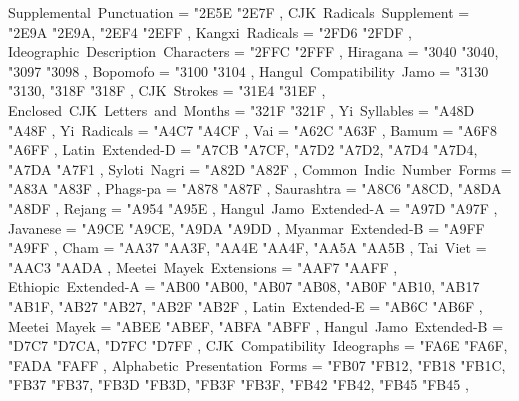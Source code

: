 {    Supplemental~Punctuation                       = { {"2E5E} {"2E7F} },
    CJK~Radicals~Supplement                        = { {"2E9A} {"2E9A}, {"2EF4} {"2EFF} },
    Kangxi~Radicals                                = { {"2FD6} {"2FDF} },
    Ideographic~Description~Characters             = { {"2FFC} {"2FFF} },
    Hiragana                                       = { {"3040} {"3040}, {"3097} {"3098} },
    Bopomofo                                       = { {"3100} {"3104} },
    Hangul~Compatibility~Jamo                      = { {"3130} {"3130}, {"318F} {"318F} },
    CJK~Strokes                                    = { {"31E4} {"31EF} },
    Enclosed~CJK~Letters~and~Months                = { {"321F} {"321F} },
    Yi~Syllables                                   = { {"A48D} {"A48F} },
    Yi~Radicals                                    = { {"A4C7} {"A4CF} },
    Vai                                            = { {"A62C} {"A63F} },
    Bamum                                          = { {"A6F8} {"A6FF} },
    Latin~Extended-D                               = { {"A7CB} {"A7CF}, {"A7D2} {"A7D2}, {"A7D4} {"A7D4}, {"A7DA} {"A7F1} },
    Syloti~Nagri                                   = { {"A82D} {"A82F} },
    Common~Indic~Number~Forms                      = { {"A83A} {"A83F} },
    Phags-pa                                       = { {"A878} {"A87F} },
    Saurashtra                                     = { {"A8C6} {"A8CD}, {"A8DA} {"A8DF} },
    Rejang                                         = { {"A954} {"A95E} },
    Hangul~Jamo~Extended-A                         = { {"A97D} {"A97F} },
    Javanese                                       = { {"A9CE} {"A9CE}, {"A9DA} {"A9DD} },
    Myanmar~Extended-B                             = { {"A9FF} {"A9FF} },
    Cham                                           = { {"AA37} {"AA3F}, {"AA4E} {"AA4F}, {"AA5A} {"AA5B} },
    Tai~Viet                                       = { {"AAC3} {"AADA} },
    Meetei~Mayek~Extensions                        = { {"AAF7} {"AAFF} },
    Ethiopic~Extended-A                            = { {"AB00} {"AB00}, {"AB07} {"AB08}, {"AB0F} {"AB10}, {"AB17} {"AB1F}, {"AB27} {"AB27}, {"AB2F} {"AB2F} },
    Latin~Extended-E                               = { {"AB6C} {"AB6F} },
    Meetei~Mayek                                   = { {"ABEE} {"ABEF}, {"ABFA} {"ABFF} },
    Hangul~Jamo~Extended-B                         = { {"D7C7} {"D7CA}, {"D7FC} {"D7FF} },
    CJK~Compatibility~Ideographs                   = { {"FA6E} {"FA6F}, {"FADA} {"FAFF} },
    Alphabetic~Presentation~Forms                  = { {"FB07} {"FB12}, {"FB18} {"FB1C}, {"FB37} {"FB37}, {"FB3D} {"FB3D}, {"FB3F} {"FB3F}, {"FB42} {"FB42}, {"FB45} {"FB45} },
}
